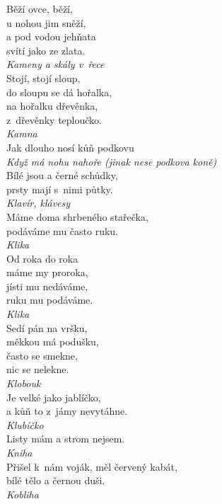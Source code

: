 \begin{multicols}{\value{columnsthindata}}
\noindent
Běží ovce, běží,\\
u nohou jim sněží,\\
a pod vodou jehňata\\
svítí jako ze zlata.\\[1 mm]
{\sl Kameny a skály v~řece}\\

\noindent
Stojí, stojí sloup,\\
do sloupu se dá hořalka,\\
na hořalku dřevěnka,\\
z~dřevěnky teploučko.\\[1 mm]
{\sl Kamna}\\

\noindent
Jak dlouho nosí kůň podkovu\\[1 mm]
{\sl Když má nohu nahoře (jinak nese podkova koně)}\\

\noindent
Bílé jsou a černé schůdky,\\
prsty mají s~nimi půtky.\\[1 mm]
{\sl Klavír, klávesy}\\

\noindent
Máme doma shrbeného stařečka,\\
podáváme mu často ruku.\\[1 mm]
{\sl Klika}\\

\noindent
Od roka do roka\\
máme my proroka,\\
jísti mu nedáváme,\\
ruku mu podáváme.\\[1 mm]
{\sl Klika}\\

\noindent
Sedí pán na vršku,\\
měkkou má podušku,\\
často se smekne,\\
nic se nelekne.\\[1 mm]
{\sl Klobouk}\\

\noindent
Je velké jako jablíčko,\\
a kůň to z~jámy nevytáhne.\\[1 mm]
{\sl Klubíčko}\\

\noindent
Listy mám a strom nejsem.\\[1 mm]
{\sl Kniha}\\

\noindent
Přišel k~nám voják, měl červený kabát,\\
bílé tělo a černou duši.\\[1 mm]
{\sl Kobliha}\\


\end{multicols}
